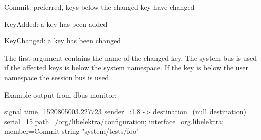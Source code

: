\begin{DoxyItemize}
\item Commit\+: preferred, keys below the changed key have changed
\item Key\+Added\+: a key has been added
\item Key\+Changed\+: a key has been changed
\end{DoxyItemize}

The first argument contains the name of the changed key. The system bus is used if the affected keys is below the {\ttfamily system} namespace. If the key is below the {\ttfamily user} namespace the session bus is used.

Example output from {\ttfamily dbus-\/monitor}\+:


\begin{DoxyCode}
signal time=1520805003.227723 sender=:1.8 -> destination=(null destination) serial=15
       path=/org/libelektra/configuration; interface=org.libelektra; member=Commit
   string "system/tests/foo"
\end{DoxyCode}
 